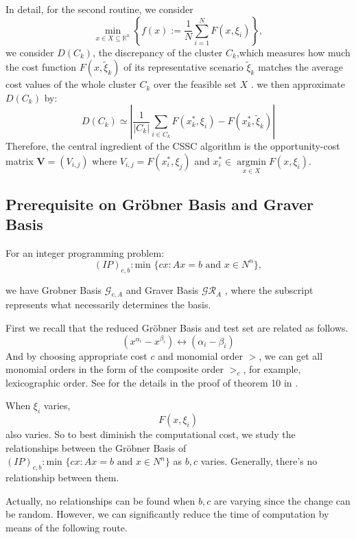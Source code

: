 \documentclass{article}
\theoremstyle{plain}
\theoremstyle{definition}
\begin{document}
In detail, for the second routine, we consider 
\begin{equation}
\min _{x \in X \subseteq \mathbb{R}^{n}}\left\{f(x):=\frac{1}{N} \sum_{i=1}^{N} F\left(x, \xi_{i}\right)\right\},
\end{equation}we consider $D\left(C_{k}\right)$, the discrepancy of the cluster $C_k$,which measures how much the cost function $ F(x, \widetilde{\xi}_{k})$  of its representative scenario  $\widetilde{\xi}_{k}$  matches the average cost values of the whole cluster  $C_{k}$  over the feasible set  $X$ .  we then approximate  $D\left(C_{k}\right)$  by:
$$
D\left(C_{k}\right) \simeq\left|\frac{1}{\left|C_{k}\right|} \sum_{i \in C_{k}} F\left(x_{k}^{*}, \xi_{i}\right)-F\left(x_{k}^{*}, \widetilde{\xi}_{k}\right)\right|
$$
Therefore, the central ingredient of the CSSC algorithm is the opportunity-cost matrix $\boldsymbol{V}=\left(V_{i, j}\right) $ where $V_{i, j}=F\left(x_{i}^{*}, \xi_{j}\right)$ and  $x_{i}^{*} \in \underset{x \in X}{\operatorname{argmin}} F\left(x, \xi_{i}\right)$.

\subsection{Prerequisite on Gröbner Basis and Graver Basis}

For an integer programming problem:
$$(IP)_{c,b}: \text{min } \{cx: Ax=b \text{ and } x\in N^{n}\},
$$

we have Grobner Basis $\mathcal{G}_{c,A}$ and Graver Basis $\mathcal{GR}_{A}$ , where the subscript represents what necessarily determines the basis.

First we recall that the reduced Gröbner Basis and test set are related as follows.
$$ (x^{\alpha_i}-x^{\beta_i}) \leftrightarrow (\alpha_i-\beta_i)
$$
 And by choosing appropriate cost $c$ and monomial order $>$, we can get all monomial orders in the form of the composite order $>_c$, for example, lexicographic order.  See for the details in the proof of theorem 10 in \cite{Yuchen1}.

When $\xi_i$ varies, 
$$
 F\left(x, \xi_{i}\right)
$$
also varies. So to best diminish the computational cost, we study the relationships between the Gröbner Basis of   $(IP)_{c,b}: \text{min } \{c x: Ax=b \text{ and } x\in N^{n}\}$ as $b,c$ varies. Generally, there's no relationship between them. 

Actually, no relationships can be found when $b,c$ are varying since the change can be random.  However, we can significantly reduce the time of computation by means of the following route.\\
\end{document}
